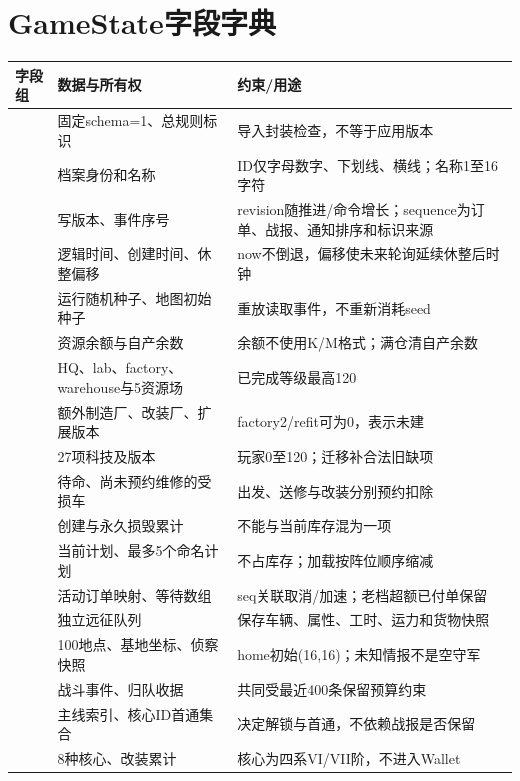 \section{GameState字段字典}
\begin{small}\begin{longtable}{@{}P{43mm}P{44mm}P{57mm}@{}}
\toprule 字段组 & 数据与所有权 & 约束/用途\\\midrule\endhead
{} & 固定schema=1、总规则标识 & 导入封装检查，不等于应用版本\\
 & 档案身份和名称 & ID仅字母数字、下划线、横线；名称1至16字符\\
 & 写版本、事件序号 & revision随推进/命令增长；sequence为订单、战报、通知排序和标识来源\\
 & 逻辑时间、创建时间、休整偏移 & now不倒退，偏移使未来轮询延续休整后时钟\\
 & 运行随机种子、地图初始种子 & 重放读取事件，不重新消耗seed\\
 & 资源余额与自产余数 & 余额不使用K/M格式；满仓清自产余数\\
 & HQ、lab、factory、warehouse与5资源场 & 已完成等级最高120\\
 & 额外制造厂、改装厂、扩展版本 & factory2/refit可为0，表示未建\\
 & 27项科技及版本 & 玩家0至120；迁移补合法旧缺项\\
 & 待命、尚未预约维修的受损车 & 出发、送修与改装分别预约扣除\\
 & 创建与永久损毁累计 & 不能与当前库存混为一项\\
 & 当前计划、最多5个命名计划 & 不占库存；加载按阵位顺序缩减\\
 & 活动订单映射、等待数组 & seq关联取消/加速；老档超额已付单保留\\
 & 独立远征队列 & 保存车辆、属性、工时、运力和货物快照\\
 & 100地点、基地坐标、侦察快照 & home初始(16,16)；未知情报不是空守军\\
 & 战斗事件、归队收据 & 共同受最近400条保留预算约束\\
 & 主线索引、核心ID首通集合 & 决定解锁与首通，不依赖战报是否保留\\
 & 8种核心、改装累计 & 核心为四系VI/VII阶，不进入Wallet\\

\end{longtable}
\end{small}
